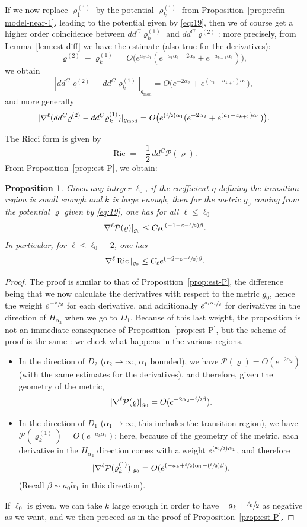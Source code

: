 \documentclass[10pt]{amsart}
\newcommand{\Psfrac}[2]{(\sfrac{#1}{#2})}
\theoremstyle{plain}
\newtheorem{prop}[thm]{Proposition}
\theoremstyle{definition}
\DeclareMathOperator{\mo}{mod}
\DeclareMathOperator{\Ric}{Ric}
\newcommand{\ta}{\tilde \alpha}
\newcommand{\opP}{\mathcal{P}}
\newcommand{\rhodeux}{\varrho^{(2)}}
\newcommand{\rhoun}{\varrho^{(1)}}
\begin{document}
If we now replace $\rhoun_1$ by the potential $\rhoun_k$ from Proposition~\ref{prop:refin-model-near-1}, leading to the potential given by \eqref{eq:19}, then we of course get a higher order coincidence between $dd^C\rhoun_k$ and $dd^C\rhodeux$: more precisely, from Lemma~\ref{lem:est-diff} we have the estimate (also true for the derivatives):
\[ \rhodeux - \rhoun_k = O\big(e^{a_0\ta_1} (e^{-a_1\alpha_1-2\alpha_2}+e^{-a_{k+1}\alpha_1}) \big), \]
we obtain
\[ |dd^C\rhodeux - dd^C\rhoun_k|_{g_{\mo}} = O\big( e^{-2\alpha_2} + e^{(a_1-a_{k+1})\alpha_1} \big), \]
and more generally
\[ |\nabla^\ell(dd^C\rhodeux - dd^C\rhoun_k)|_{g_{\mo}} = O\big( e^{\Psfrac\ell2 \alpha_1}(e^{-2\alpha_2} + e^{(a_1-a_{k+1})\alpha_1}) \big). \]

The Ricci form is given by
\[ \Ric = - \frac12\, dd^C \opP(\varrho). \]
From Proposition~\ref{prop:est-P}, we obtain:
\begin{prop}\label{prop:est-Ric}
Given any integer $\ell_0$, if the coefficient $\eta$ defining the transition region is small enough and $k$ is large enough, then for the metric $g_0$ coming from the potential $\varrho$ given by \eqref{eq:19}, one has for all $\ell\leq\ell_0$
\[ |\nabla^\ell \opP(\varrho)|_{g_0} \leq C_\ell e^{(-1-\varepsilon-\sfrac\ell2)\beta}. \]
In particular, for $\ell\leq \ell_0-2$, one has
\[ |\nabla^\ell\Ric|_{g_0} \leq C_\ell e^{(-2-\varepsilon-\sfrac\ell2)\beta}. \]
\end{prop}
\begin{proof}
The proof is similar to that of Proposition~\ref{prop:est-P}, the difference being that we now calculate the derivatives with respect to the metric $g_0$, hence the weight $e^{-\sfrac \beta2}$ for each derivative, and additionally $e^{\sfrac{a_1\alpha_1}2}$ for derivatives in the direction of $H_{\alpha_2}$ when we go to $D_1$. Because of this last weight, the proposition is not an immediate consequence of Proposition~\ref{prop:est-P}, but the scheme of proof is the same : we check what happens in the various regions.
\begin{itemize}
\item In the direction of $D_2$ ($\alpha_2\to\infty$, $\alpha_1$ bounded), we have $\opP(\varrho)=O(e^{-2\alpha_2})$ (with the same estimates for the derivatives), and therefore, given the geometry of the metric,
\[ |\nabla^\ell \opP(\varrho)|_{g_0} = O(e^{-2\alpha_2-\sfrac \ell2 \beta}) . \]
\item In the direction of $D_1$ ($\alpha_1\to\infty$, this includes the transition region), we have $\opP(\rhoun_k)=O(e^{-a_k\alpha_1})$; here, because of the geometry of the metric, each derivative in the $H_{\alpha_2}$ direction comes with a weight $e^{\Psfrac{a_1}2\alpha_1}$, and therefore
\[ |\nabla^\ell \opP(\rhoun_k)|_{g_0} = O(e^{(-a_k+\sfrac\ell2)\alpha_1-\Psfrac \ell2 \beta}). \]
(Recall $\beta\sim a_0\ta_1$ in this direction).
\end{itemize}
If $\ell_0$ is given, we can take $k$ large enough in order to have $-a_k+\sfrac{\ell_0}2$ as negative as we want, and we then proceed as in the proof of Proposition~\ref{prop:est-P}.
\end{proof}
\end{document}
